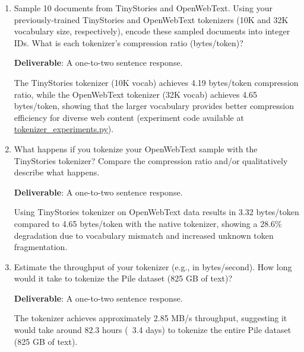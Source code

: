 
\begin{enumerate}[label=(\alph*)]
    \item Sample 10 documents from TinyStories and OpenWebText. Using your previously-trained TinyStories and OpenWebText tokenizers (10K and 32K vocabulary size, respectively), encode these sampled documents into integer IDs. What is each tokenizer's compression ratio (bytes/token)?
    
    \textbf{Deliverable}: A one-to-two sentence response.
    
    \begin{answer}
    The TinyStories tokenizer (10K vocab) achieves 4.19 bytes/token compression ratio, while the OpenWebText tokenizer (32K vocab) achieves 4.65 bytes/token, showing that the larger vocabulary provides better compression efficiency for diverse web content (experiment code available at \href{https://github.com/donglinkang2021/assignment1-basics/blob/main/data_utils/tokenizer_experiments.py}{tokenizer\_experiments.py}).
    \end{answer}

    \item What happens if you tokenize your OpenWebText sample with the TinyStories tokenizer? Compare the compression ratio and/or qualitatively describe what happens.

    \textbf{Deliverable}: A one-to-two sentence response.

    \begin{answer}
    Using TinyStories tokenizer on OpenWebText data results in 3.32 bytes/token compared to 4.65 bytes/token with the native tokenizer, showing a 28.6\% degradation due to vocabulary mismatch and increased unknown token fragmentation.
    \end{answer}

    \item Estimate the throughput of your tokenizer (e.g., in bytes/second). How long would it take to tokenize the Pile dataset (825 GB of text)?

    \textbf{Deliverable}: A one-to-two sentence response.

    \begin{answer}
    The tokenizer achieves approximately 2.85 MB/s throughput, suggesting it would take around 82.3 hours (~3.4 days) to tokenize the entire Pile dataset (825 GB of text).
    \end{answer}


\end{enumerate}
